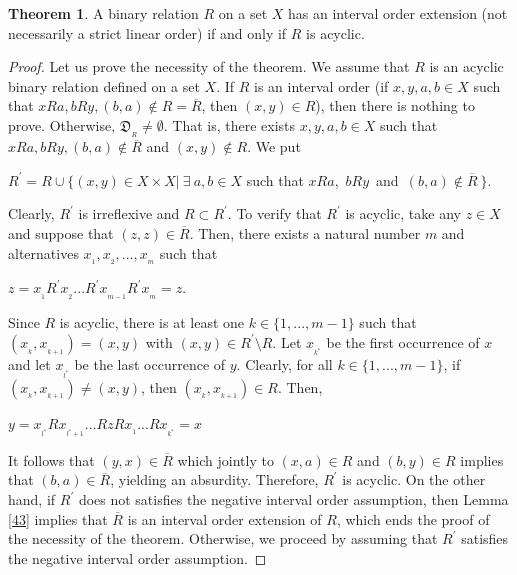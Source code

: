 \documentclass{article}
\theoremstyle{definition}
\newtheorem{theorem}{Theorem}[section]
\begin{document}
\begin{theorem}\label{a11} A binary relation $R$ on a set $X$ has an
interval
order extension (not necessarily a strict linear order)
if and only if $R$ is acyclic.
\end{theorem}
\begin{proof} 
Let us prove the necessity of the theorem.
We assume that $R$ is an acyclic binary relation defined on a set $X$.
If $R$ is an interval order (if $x, y, a, b\in X$ such that 
$xRa, bRy, (b,a)\notin R=\overline{R}$, then $(x,y)\in R$), then there is nothing to prove.
Otherwise, 
$\mathfrak{D}_{_R}\neq\emptyset$. That is,
there exists $x, y, a, b\in X$ such that 
$xRa, bRy, (b,a)\notin \overline{R}$ and $(x,y)\notin R$.
We put
\begin{center}
$R^{\prime}=R\cup\{(x,y)\in X\times X \vert \ \exists 
\ a, b\in X$  such that
$xRa$,\ $bRy$\ {\rm and}\  $(b,a)\notin \overline{R}\ \}$.
\end{center}
Clearly, $R^{\prime}$ is irreflexive and $R\subset R^{\prime}$.
To verify that $R^{\prime}$
is acyclic, take any $z\in X$ and suppose that $(z,z)\in \overline{R}$. Then, there exists a natural number $m$ and alternatives $x_{_1}, x_{_2},...,x_{_m}$ such that 
\begin{center}
$z=x_{_1}R^{\prime}x_{_2}...R^{\prime}x_{_{m-1}}R^{\prime}x_{_{m}}=z$.
\end{center}
Since $R$ is acyclic, 
there is at least one $k\in \{1,...,m-1\}$ such that $(x_{_k},x_{_{k+1}})=(x,y)$ with $(x,y)\in R^{\prime}\setminus R$.
Let $x_{_{k^{\ast}}}$ be the first occurrence of $x$ and 
let $x_{_{l^{\ast}}}$ be the last occurrence of $y$. 
Clearly, for all
$k\in \{1,...,m-1\}$,
if $(x_{_k},x_{_{k+1}})\neq (x,y)$, then $(x_{_k},x_{_{k+1}})\in R$.
Then,
\begin{center}
$y=x_{_{l^{\ast}}}Rx_{_{l^{\ast}+1}}...RzRx_{_1}...Rx_{_{k^{\ast}}}=x$
\end{center}
It follows that $(y,x)\in \overline{R}$ which jointly to 
$(x,a)\in R$ and $(b,y)\in R$ implies that $(b,a)\in \overline{R}$, yielding an absurdity.
Therefore, $R^{\prime}$ is acyclic. On the other hand, if $R^{\prime}$ does not satisfies the 
negative interval order assumption, then Lemma \ref{43} implies that $\overline{R}$ is
an interval order extension of $R$, which ends the proof of the necessity of the theorem.
Otherwise, we proceed by assuming that $R^{\prime}$ satisfies 
the 
negative interval order assumption. 


\end{proof}
\end{document}
